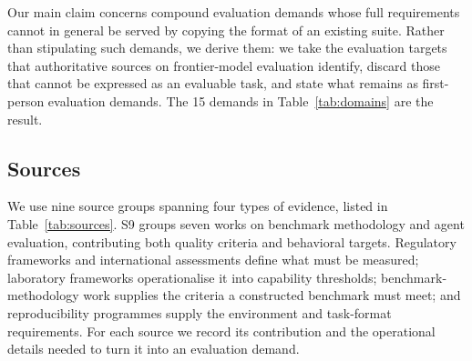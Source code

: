 \documentclass{article} %
\begin{document}
	Our main claim concerns compound evaluation demands whose full requirements cannot in general be served by copying the format of an existing suite. Rather than stipulating such demands, we derive them: we take the evaluation targets that authoritative sources on frontier-model evaluation identify, discard those that cannot be expressed as an evaluable task, and state what remains as first-person evaluation demands. The 15 demands in Table~\ref{tab:domains} are the result.
	
	\subsection{Sources}
	
	We use nine source groups spanning four types of evidence, listed in Table~\ref{tab:sources}. S9 groups seven works on benchmark methodology and agent evaluation, contributing both quality criteria and behavioral targets. Regulatory frameworks and international assessments define what must be measured; laboratory frameworks operationalise it into capability thresholds; benchmark-methodology work supplies the criteria a constructed benchmark must meet; and reproducibility programmes supply the environment and task-format requirements. For each source we record its contribution and the operational details needed to turn it into an evaluation demand.
	
\end{document}
